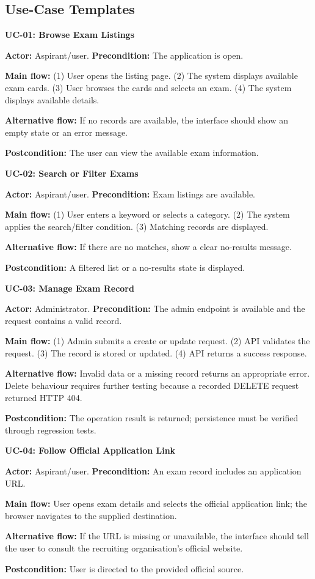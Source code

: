 \documentclass[12pt,a4paper]{report}
\begin{document}
\subsection{Use-Case Templates}
\textbf{UC-01: Browse Exam Listings}\par
\textbf{Actor:} Aspirant/user. \textbf{Precondition:} The application is open.\par
\textbf{Main flow:} (1) User opens the listing page. (2) The system displays available exam cards. (3) User browses the cards and selects an exam. (4) The system displays available details.\par
\textbf{Alternative flow:} If no records are available, the interface should show an empty state or an error message.\par
\textbf{Postcondition:} The user can view the available exam information.

\textbf{UC-02: Search or Filter Exams}\par
\textbf{Actor:} Aspirant/user. \textbf{Precondition:} Exam listings are available.\par
\textbf{Main flow:} (1) User enters a keyword or selects a category. (2) The system applies the search/filter condition. (3) Matching records are displayed.\par
\textbf{Alternative flow:} If there are no matches, show a clear no-results message.\par
\textbf{Postcondition:} A filtered list or a no-results state is displayed.

\textbf{UC-03: Manage Exam Record}\par
\textbf{Actor:} Administrator. \textbf{Precondition:} The admin endpoint is available and the request contains a valid record.\par
\textbf{Main flow:} (1) Admin submits a create or update request. (2) API validates the request. (3) The record is stored or updated. (4) API returns a success response.\par
\textbf{Alternative flow:} Invalid data or a missing record returns an appropriate error. Delete behaviour requires further testing because a recorded DELETE request returned HTTP 404.\par
\textbf{Postcondition:} The operation result is returned; persistence must be verified through regression tests.

\textbf{UC-04: Follow Official Application Link}\par
\textbf{Actor:} Aspirant/user. \textbf{Precondition:} An exam record includes an application URL.\par
\textbf{Main flow:} User opens exam details and selects the official application link; the browser navigates to the supplied destination.\par
\textbf{Alternative flow:} If the URL is missing or unavailable, the interface should tell the user to consult the recruiting organisation's official website.\par
\textbf{Postcondition:} User is directed to the provided official source.
\end{document}
